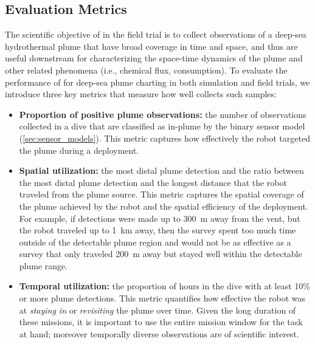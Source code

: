 \subsection{Evaluation Metrics}
\label{sec:eval_metrics}
The scientific objective of \Sentry in the field trial is to collect observations of a deep-sea hydrothermal plume that have broad coverage in time and space, and thus are useful downstream for characterizing the space-time dynamics of the plume and other related phenomena (i.e., chemical flux, consumption). To evaluate the performance of \PHORTEX for deep-sea plume charting in both simulation and field trials, we introduce three key metrics that measure how well \Sentry collects such samples:
\begin{itemize}
    \item \textbf{Proportion of positive plume observations:} the number of observations collected in a dive that are classified as in-plume by the binary sensor model (\cref{sec:sensor_models}). This metric captures how effectively the robot targeted the plume during a deployment.
    \item \textbf{Spatial utilization:} the most distal plume detection and the ratio between the most distal plume detection and the longest distance that the robot traveled from the plume source. This metric captures the spatial coverage of the plume achieved by the robot and the spatial efficiency of the deployment. For example, if detections were made up to \SI{300}{\meter} away from the vent, but the robot traveled up to \SI{1}{\km} away, then the survey spent too much time outside of the detectable plume region and would not be as effective as a survey that only traveled \SI{200}{\meter} away but stayed well within the detectable plume range. 
    \item \textbf{Temporal utilization:} the proportion of hours in the dive with at least 10\% or more plume detections. This metric quantifies how effective the robot was at \emph{staying in} or \emph{revisiting} the plume over time. Given the long duration of these missions, it is important to use the entire mission window for the task at hand; moreover temporally diverse observations are of scientific interest.
\end{itemize}


